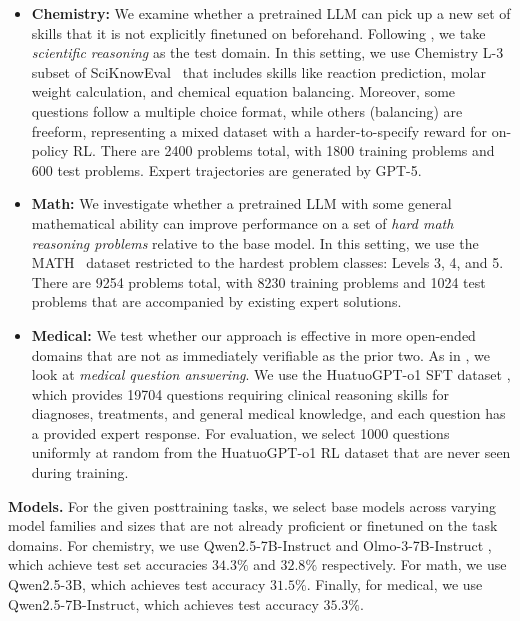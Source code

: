 \documentclass{article}
\renewcommand{\paragraph}[1]{\vspace{.1em}\noindent\textbf{#1}}
\begin{document}
\begin{itemize}[leftmargin=*]
    
    \item \textbf{Chemistry:} We examine whether a pretrained LLM can pick up a new set of skills that it is not explicitly finetuned on beforehand. Following \cite{shenfeld2026self}, we take \textit{scientific reasoning} as the test domain. In this setting, we use Chemistry L-3 subset of SciKnowEval~\citep{feng2024sciknoweval} that includes skills like reaction prediction, molar weight calculation, and chemical equation balancing. Moreover, some questions follow a multiple choice format, while others (balancing) are freeform, representing a mixed dataset with a harder-to-specify reward for on-policy RL. There are 2400 problems total, with 1800 training problems and 600 test problems. Expert trajectories are generated by GPT-5. 

    \item \textbf{Math:} We investigate whether a pretrained LLM with some general mathematical ability can improve performance on a set of \textit{hard math reasoning problems} relative to the base model. In this setting, we use the MATH~\citep{hendrycks2021math} dataset restricted to the hardest problem classes: Levels 3, 4, and 5. There are 9254 problems total, with 8230 training problems and 1024 test problems that are accompanied by existing expert solutions. 

    \item \textbf{Medical:} We test whether our approach is effective in more open-ended domains that are not as immediately verifiable as the prior two. As in \cite{shenfeld2026self}, we look at \textit{medical question answering}. We use the HuatuoGPT-o1 SFT dataset \citep{chen2024huatuogpt}, which provides 19704 questions requiring clinical reasoning skills  for diagnoses, treatments, and general medical knowledge, and each question has a provided expert response. For evaluation, we select 1000 questions uniformly at random from the HuatuoGPT-o1 RL dataset that are never seen during training.

   
\end{itemize}
\vspace{-5pt}

\paragraph{Models.} For the given posttraining tasks, we select base models across varying model families and sizes that are not already proficient or finetuned on the task domains. For chemistry, we use Qwen2.5-7B-Instruct \citep{yang2024qwen25} and Olmo-3-7B-Instruct \citep{olmo2025olmo3}, which achieve test set accuracies $34.3\%$ and $32.8\%$ respectively. For math, we use Qwen2.5-3B, which achieves test accuracy $31.5\%$. Finally, for medical, we use Qwen2.5-7B-Instruct, which achieves test accuracy $35.3\%$.
\end{document}
